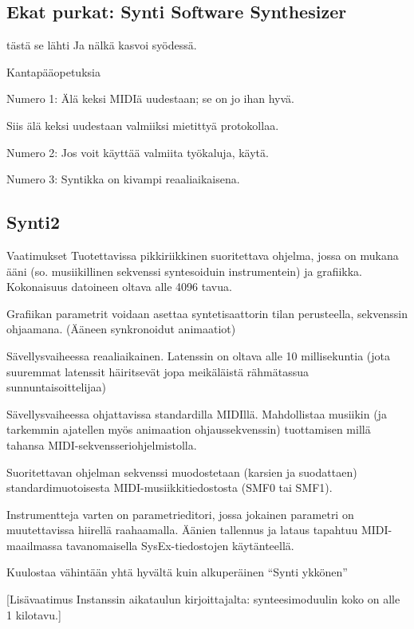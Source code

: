 \documentclass{beamer}
\begin{document}
\subsection{Ekat purkat: Synti Software Synthesizer}
\begin{frame}{tästä se lähti}
Ja nälkä kasvoi syödessä.
\end{frame}

\begin{frame}{Kantapääopetuksia}

  Numero 1: Älä keksi MIDIä uudestaan; se on jo ihan hyvä.

  Siis älä keksi uudestaan valmiiksi mietittyä protokollaa.

  Numero 2: Jos voit käyttää valmiita työkaluja, käytä.

  Numero 3: Syntikka on kivampi reaaliaikaisena.

\end{frame}


\subsection{Synti2}
\begin{frame}{Vaatimukset}
  Tuotettavissa pikkiriikkinen suoritettava ohjelma, jossa on mukana
  ääni (so. musiikillinen sekvenssi syntesoiduin instrumentein) ja
  grafiikka. Kokonaisuus datoineen oltava alle 4096 tavua.

  Grafiikan parametrit voidaan asettaa syntetisaattorin tilan
  perusteella, sekvenssin ohjaamana. (Ääneen synkronoidut animaatiot)

  Sävellysvaiheessa reaaliaikainen. Latenssin on oltava alle 10
  millisekuntia (jota suuremmat latenssit häiritsevät jopa meikäläistä
  rähmätassua sunnuntaisoittelijaa)

  Sävellysvaiheessa ohjattavissa standardilla MIDIllä. Mahdollistaa
  musiikin (ja tarkemmin ajatellen myös animaation ohjaussekvenssin)
  tuottamisen millä tahansa MIDI-sekvensseriohjelmistolla.

  Suoritettavan ohjelman sekvenssi muodostetaan (karsien ja
  suodattaen) standardimuotoisesta MIDI-musiikkitiedostosta (SMF0 tai
  SMF1).

  Instrumentteja varten on parametrieditori, jossa jokainen parametri
  on muutettavissa hiirellä raahaamalla. Äänien tallennus ja lataus
  tapahtuu MIDI-maailmassa tavanomaisella SysEx-tiedostojen
  käytänteellä.

  Kuulostaa vähintään yhtä hyvältä kuin alkuperäinen ``Synti ykkönen''

  [Lisävaatimus Instanssin aikataulun kirjoittajalta: synteesimoduulin
    koko on alle 1 kilotavu.]

\end{frame}
\end{document}
